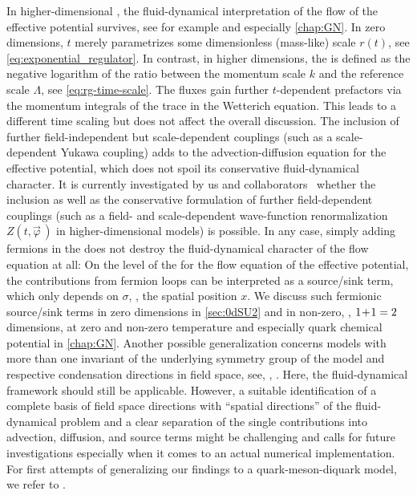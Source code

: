In higher-dimensional \qfts{}, the fluid-dynamical interpretation of the \frg{} flow of the effective potential survives, see for example  and especially \cref{chap:GN}.
In zero dimensions, $t$ merely parametrizes some dimensionless (mass-like) scale $r ( t )$, see \cref{eq:exponential_regulator}. 
In contrast, in higher dimensions, the \rgtime{} is defined as the negative logarithm of the ratio between the \rg{} momentum scale $k$ and the \uv{} reference scale $\Lambda$, see \cref{eq:rg-time-scale}.
The fluxes gain further $t$-dependent prefactors via the momentum integrals of the trace in the Wetterich equation.
This leads to a different time scaling but does not affect the overall discussion. 
The inclusion of further field-independent but scale-dependent couplings (such as a scale-dependent Yukawa coupling) adds \odes{} to the advection-diffusion equation for the effective potential, which does not spoil its conservative fluid-dynamical character.
It is currently investigated by us and collaborators~\cite{Ihssen2020,Grossi:2021ksl,Ihssen:2022xkr,Ihssen:2023nqd,Ihssen:2023xlp} whether the inclusion as well as the conservative formulation of further field-dependent couplings (such as a field- and scale-dependent wave-function renormalization $Z ( t, \vec{\varphi} \, )$ in higher-dimensional models) is possible.
In any case, simply adding fermions in the \lpa{} does not destroy the fluid-dynamical character of the \frg{} flow equation at all: On the level of the \lpa{} for the \frg{} flow equation of the effective potential, the contributions from fermion loops can be interpreted as a source/sink term, which only depends on $\sigma$, \ie{}, the spatial position $x$.
We discuss such fermionic source/sink terms in zero dimensions in \cref{sec:0dSU2} and in non-zero, \ie{}, $1\mkern-3mu + \mkern-3mu 1=2$ dimensions, at zero and non-zero temperature and especially quark chemical potential in \cref{chap:GN}.
Another possible generalization concerns models with more than one invariant of the underlying symmetry group of the model and respective condensation directions in field space, see, \eg{}, .
Here, the fluid-dynamical framework should still be applicable.
However, a suitable identification of a complete basis of field space directions with ``spatial directions'' of the fluid-dynamical problem and a clear separation of the single contributions into advection, diffusion, and source terms might be challenging and calls for future investigations \dash{} especially when it comes to an actual numerical implementation.
For first attempts of generalizing our findings to a quark-meson-diquark model, we refer to .

